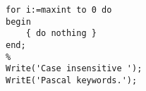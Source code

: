 \documentclass{jarticle}
\begin{document}

\begin{lstlisting}
for i:=maxint to 0 do
begin
    { do nothing }
end;
%
Write('Case insensitive ');
WritE('Pascal keywords.');
\end{lstlisting}
\end{document}
